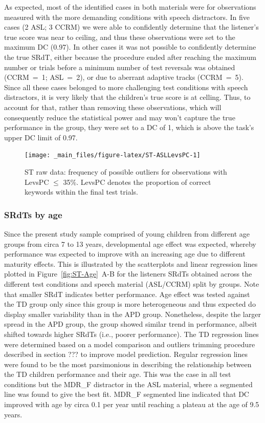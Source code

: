 \documentclass[a4paper, twoside]{templates/ociamthesis}
\begin{document}
As expected, most of the identified cases in both materials were for observations measured with the more demanding conditions with speech distractors. In five cases (2 ASL; 3 CCRM) we were able to confidently determine that the listener's true score was near to ceiling, and thus these observations were set to the maximum DC (0.97). In other cases it was not possible to confidently determine the true SRdT, either because the procedure ended after reaching the maximum number or trials before a minimum number of test reversals was obtained (CCRM~=~1; ASL~=~2), or due to aberrant adaptive tracks (CCRM~=~5). Since all these cases belonged to more challenging test conditions with speech distractors, it is very likely that the children's true score is at celling. Thus, to account for that, rather than removing these observations, which will consequently reduce the statistical power and may won't capture the true performance in the group, they were set to a DC of 1, which is above the task's upper DC limit of 0.97.

\begin{figure}
\texttt{[image: \_main\_files/figure-latex/ST-ASLLevsPC-1]} \caption{ST raw data: frequency of possible outliers for observations with LevsPC $\leq$ 35\%. LevsPC denotes the proportion of correct keywords within the final test trials.}\label{fig:ST-ASLLevsPC}
\end{figure}

\hypertarget{srdts-by-age}{%
\subsubsection*{SRdTs by age}\label{srdts-by-age}}

Since the present study sample comprised of young children from different age groups from circa 7 to 13 years, developmental age effect was expected, whereby performance was expected to improve with an increasing age due to different maturity effects. This is illustrated by the scatterplots and linear regression lines plotted in Figure~\ref{fig:ST-Age}~A-B for the listeners SRdTs obtained across the different test conditions and speech material (ASL/CCRM) split by groups. Note that smaller SRdT indicates better performance. Age effect was tested against the TD group only since this group is more heterogeneous and thus expected do display smaller variability than in the APD group. Nonetheless, despite the larger spread in the APD group, the group showed similar trend in performance, albeit shifted towards higher SRdTs (i.e., poorer performance). The TD regression lines were determined based on a model comparison and outliers trimming procedure described in section ??? to improve model prediction. Regular regression lines were found to be the most parsimonious in describing the relationship between the TD children performance and their age. This was the case in all test conditions but the MDR\_F distractor in the ASL material, where a segmented line was found to give the best fit. MDR\_F segmented line indicated that DC improved with age by circa 0.1 per year until reaching a plateau at the age of 9.5 years.
\end{document}
